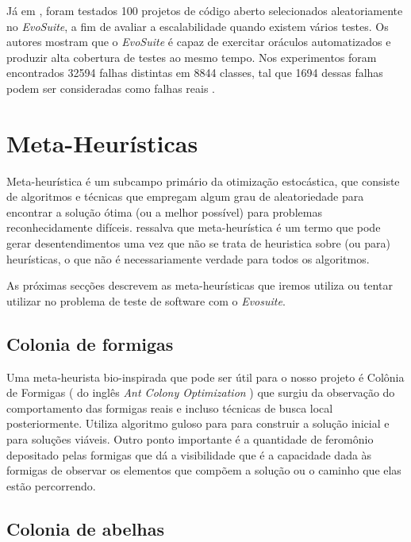\documentclass[conference]{IEEEtran}
\begin{document}
Já em \cite{fraser20151600}, foram testados 100 projetos de código aberto selecionados aleatoriamente no \textit{EvoSuite}, a fim de avaliar a escalabilidade quando existem vários testes. Os autores mostram que o \textit{EvoSuite} é capaz de exercitar oráculos automatizados e produzir alta cobertura de testes ao mesmo tempo. Nos experimentos foram encontrados 32594 falhas distintas em 8844 classes, tal que 1694 dessas falhas podem ser consideradas como falhas reais \cite{fraser20151600}.



\section{Meta-Heurísticas} \label{MetaHeuristicas}

Meta-heurística é um subcampo primário da otimização estocástica, que consiste de algoritmos e técnicas que empregam algum grau de aleatoriedade para encontrar a solução ótima (ou a melhor possível) para problemas reconhecidamente difíceis. \cite{luke2009essentials} \cite{luke2009essentials} ressalva que meta-heurística é um termo que pode gerar desentendimentos
uma vez que não se trata de heuristica sobre (ou para) heurísticas, o que não é necessariamente verdade para todos os algoritmos.  

As próximas secções descrevem as meta-heurísticas que iremos utiliza ou tentar utilizar no problema de teste de software com o \textit{Evosuite}.

\subsection{Colonia de formigas}

Uma meta-heurista bio-inspirada que pode ser útil para o nosso projeto é Colônia de Formigas \cite{dorigo1999ant} ( do inglês \textit{Ant Colony Optimization} ) que surgiu da observação do
comportamento das formigas reais e incluso técnicas de busca local posteriormente. Utiliza algoritmo guloso para para construir a solução inicial e para soluções viáveis. Outro ponto
importante é a quantidade de feromônio depositado pelas formigas que dá a visibilidade que é a capacidade dada às formigas de observar os elementos que compõem a solução ou o caminho que
elas estão percorrendo.





\subsection{Colonia de abelhas}
\end{document}
